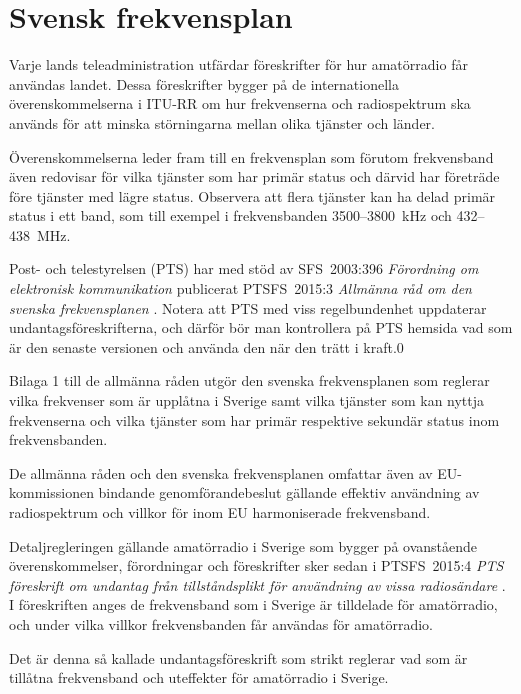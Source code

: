 \chapter{Svensk frekvensplan} 
\label{svensk frekvensplan} 

Varje lands teleadministration utfärdar föreskrifter för hur amatörradio får
användas landet.
Dessa föreskrifter bygger på de internationella överenskommelserna i ITU-RR
\cite[ARTICLE 5]{ITU-RR} om hur frekvenserna och radiospektrum ska används för att minska
störningarna mellan olika tjänster och länder.

Överenskommelserna leder fram till en frekvensplan som förutom frekvensband även
redovisar för vilka tjänster som har primär status och därvid har företräde före
tjänster med lägre status.
Observera att flera tjänster kan ha delad primär status i ett band, som till 
exempel i frekvensbanden 3500--3800~kHz och 432--438~MHz. 

Post- och telestyrelsen (PTS) har med stöd av SFS~2003:396
\emph{Förordning om elektronisk kommunikation} \cite{SFS2003:396}
publicerat PTSFS~2015:3 \emph{Allmänna råd om den svenska frekvensplanen}
\cite{PTSFS2015:3}.
Notera att PTS med viss regelbundenhet uppdaterar undantagsföreskrifterna,
och därför bör man kontrollera på PTS hemsida vad som är den senaste versionen
och använda den när den trätt i kraft.0

Bilaga 1 till de allmänna råden utgör den svenska frekvensplanen som reglerar
vilka frekvenser som är upplåtna i Sverige samt vilka tjänster som kan nyttja
frekvenserna och vilka tjänster som har primär respektive sekundär status inom
frekvensbanden.

De allmänna råden och den svenska frekvensplanen omfattar även av 
EU-kommissionen bindande genomförandebeslut gällande effektiv användning av
radiospektrum och villkor för inom EU harmoniserade frekvensband.

Detaljregleringen gällande amatörradio i Sverige som bygger på ovanstående
överenskommelser, förordningar och föreskrifter sker sedan i PTSFS~2015:4
\emph{PTS föreskrift om undantag från tillståndsplikt för användning av vissa
  radiosändare} \cite{PTSFS2015:4}.
I föreskriften anges de frekvensband som i Sverige är tilldelade för
amatörradio, och under vilka villkor frekvensbanden får användas för
amatörradio.
 
Det är denna så kallade undantagsföreskrift som strikt reglerar vad som är 
tillåtna frekvensband och uteffekter för amatörradio i Sverige.
 
